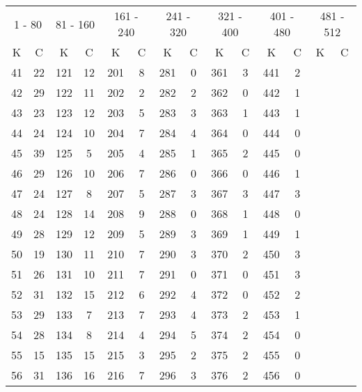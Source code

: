 \newpage

 \begin{table}
  \centering
  \label{tab:Messwerte2}
  \begin{tabular}{c|c||c|c||c|c||c|c||c|c||c|c||c|c}
  \toprule
  \multicolumn{2}{c}{1 - 80}    & \multicolumn{2}{c}{81 - 160}  &
  \multicolumn{2}{c}{161 - 240} & \multicolumn{2}{c}{241 - 320} &
  \multicolumn{2}{c}{321 - 400} & \multicolumn{2}{c}{401 - 480} &
  \multicolumn{2}{c}{481 - 512} \\
 \cmidrule(lr){1-2}\cmidrule(lr){3-4}\cmidrule(lr){5-6}\cmidrule(lr){7-8}\cmidrule(lr){9-10}\cmidrule(lr){11-12}\cmidrule(lr){13-14}
  K & C & K & C & K & C & K & C & K & C & K & C & K & C \\
  \midrule
 41 & 22  & 121 & 12 & 201 &  8 & 281 &  0 & 361 & 3 & 441 & 2 &     &  \\
 42 & 29  & 122 & 11 & 202 &  2 & 282 &  2 & 362 & 0 & 442 & 1 &     &  \\
 43 & 23  & 123 & 12 & 203 &  5 & 283 &  3 & 363 & 1 & 443 & 1 &     &  \\
 44 & 24  & 124 & 10 & 204 &  7 & 284 &  4 & 364 & 0 & 444 & 0 &     &  \\
 45 & 39  & 125 &  5 & 205 &  4 & 285 &  1 & 365 & 2 & 445 & 0 &     &  \\
 46 & 29  & 126 & 10 & 206 &  7 & 286 &  0 & 366 & 0 & 446 & 1 &     &  \\
 47 & 24  & 127 &  8 & 207 &  5 & 287 &  3 & 367 & 3 & 447 & 3 &     &  \\
 48 & 24  & 128 & 14 & 208 &  9 & 288 &  0 & 368 & 1 & 448 & 0 &     &  \\
 49 & 28  & 129 & 12 & 209 &  5 & 289 &  3 & 369 & 1 & 449 & 1 &     &  \\
 50 & 19  & 130 & 11 & 210 &  7 & 290 &  3 & 370 & 2 & 450 & 3 &     &  \\
 51 & 26  & 131 & 10 & 211 &  7 & 291 &  0 & 371 & 0 & 451 & 3 &     &  \\
 52 & 31  & 132 & 15 & 212 &  6 & 292 &  4 & 372 & 0 & 452 & 2 &     &  \\
 53 & 29  & 133 &  7 & 213 &  7 & 293 &  4 & 373 & 2 & 453 & 1 &     &  \\
 54 & 28  & 134 &  8 & 214 &  4 & 294 &  5 & 374 & 2 & 454 & 0 &     &  \\
 55 & 15  & 135 & 15 & 215 &  3 & 295 &  2 & 375 & 2 & 455 & 0 &     &  \\
 56 & 31  & 136 & 16 & 216 &  7 & 296 &  3 & 376 & 2 & 456 & 0 &     &  \\

\end{tabular}
\end{table}
